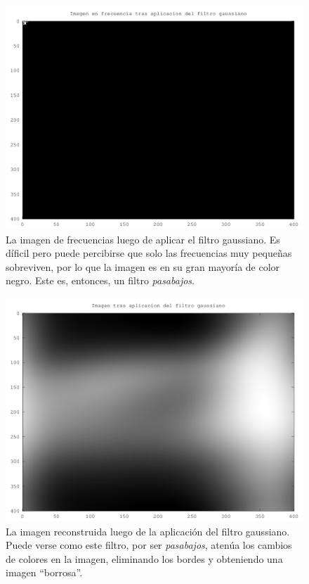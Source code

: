 \documentclass[twocolumn,a4paper,10pt]{article}
\begin{document}
\begin{figure}[H]
        \includegraphics[width=\linewidth]{../images/gaussFilterFreq.png}
        \caption{La imagen de frecuencias luego de aplicar el filtro gaussiano. Es d\'ificil pero puede percibirse que solo las frecuencias muy pequeñas 
        sobreviven, por lo que la imagen es en su gran mayoría de color negro. Este es, entonces, un filtro \textit{pasabajos}.}
        \label{fig:gaussFilterFrequency}
\end{figure}

\begin{figure}[H]
        \includegraphics[width=\linewidth]{../images/gaussFilter.png}
        \caption{La imagen reconstruida luego de la aplicaci\'on del filtro gaussiano. Puede verse como este filtro, por ser \textit{pasabajos}, aten\'ua 
        los cambios de colores en la imagen, eliminando los bordes y obteniendo una imagen ``borrosa''.}
        \label{fig:gaussFilter}
\end{figure}
\end{document}
